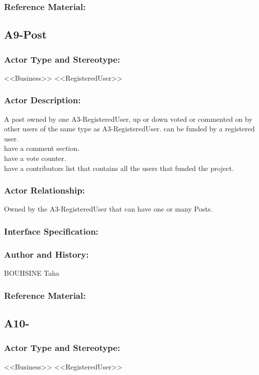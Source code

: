 \documentclass[11pt, openany]{report}
\begin{document}
\subsubsection{Reference Material:}

\clearpage
\subsection{A9-Post}
\label{A9}
\subsubsection{Actor Type and Stereotype:}
<<Business>> <<RegisteredUser>>
\subsubsection{Actor Description:}
A post owned by one A3-RegisteredUser, up or down voted or commented on by other users of the same type as A3-RegisteredUser.
can be funded by a registered user.\\
have a comment section.\\
have a vote counter.\\
have a contributors list that contains all the users that funded the project.\\

\subsubsection{Actor Relationship:}
Owned by the A3-RegisteredUser that can have one or many Posts.
\subsubsection{Interface Specification:}
\subsubsection{Author and History:}
BOUHSINE Taha
\subsubsection{Reference Material:}

\clearpage
\subsection{A10-}
\label{A10}
\subsubsection{Actor Type and Stereotype:}
<<Business>> <<RegisteredUser>>
\end{document}
